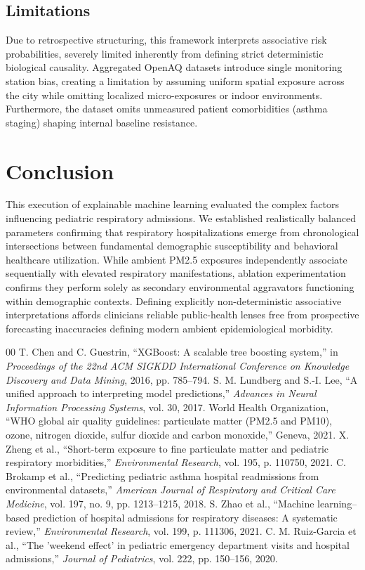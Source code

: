 \documentclass[conference]{IEEEtran}
\begin{document}
\subsection{Limitations}
Due to retrospective structuring, this framework interprets associative risk probabilities, severely limited inherently from defining strict deterministic biological causality. Aggregated OpenAQ datasets introduce single monitoring station bias, creating a limitation by assuming uniform spatial exposure across the city while omitting localized micro-exposures or indoor environments. Furthermore, the dataset omits unmeasured patient comorbidities (asthma staging) shaping internal baseline resistance. 

\section{Conclusion}
This execution of explainable machine learning evaluated the complex factors influencing pediatric respiratory admissions. We established realistically balanced parameters confirming that respiratory hospitalizations emerge from chronological intersections between fundamental demographic susceptibility and behavioral healthcare utilization. While ambient PM2.5 exposures independently associate sequentially with elevated respiratory manifestations, ablation experimentation confirms they perform solely as secondary environmental aggravators functioning within demographic contexts. Defining explicitly non-deterministic associative interpretations affords clinicians reliable public-health lenses free from prospective forecasting inaccuracies defining modern ambient epidemiological morbidity.

\begin{thebibliography}{00}
 T. Chen and C. Guestrin, ``XGBoost: A scalable tree boosting system,'' in \textit{Proceedings of the 22nd ACM SIGKDD International Conference on Knowledge Discovery and Data Mining}, 2016, pp. 785--794.
 S. M. Lundberg and S.-I. Lee, ``A unified approach to interpreting model predictions,'' \textit{Advances in Neural Information Processing Systems}, vol. 30, 2017.
 World Health Organization, ``WHO global air quality guidelines: particulate matter (PM2.5 and PM10), ozone, nitrogen dioxide, sulfur dioxide and carbon monoxide,'' Geneva, 2021.
 X. Zheng et al., ``Short-term exposure to fine particulate matter and pediatric respiratory morbidities,'' \textit{Environmental Research}, vol. 195, p. 110750, 2021.
 C. Brokamp et al., ``Predicting pediatric asthma hospital readmissions from environmental datasets,'' \textit{American Journal of Respiratory and Critical Care Medicine}, vol. 197, no. 9, pp. 1213--1215, 2018.
 S. Zhao et al., ``Machine learning–based prediction of hospital admissions for respiratory diseases: A systematic review,'' \textit{Environmental Research}, vol. 199, p. 111306, 2021.
 C. M. Ruiz-Garcia et al., ``The 'weekend effect' in pediatric emergency department visits and hospital admissions,'' \textit{Journal of Pediatrics}, vol. 222, pp. 150--156, 2020.
\end{thebibliography}
\end{document}
